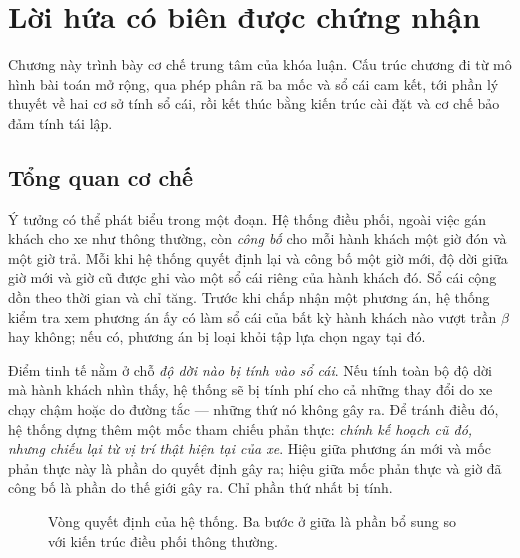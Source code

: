 \chapter{Lời hứa có biên được chứng nhận}

Chương này trình bày cơ chế trung tâm của khóa luận. Cấu trúc chương đi từ mô hình bài toán mở
rộng, qua phép phân rã ba mốc và sổ cái cam kết, tới phần lý thuyết về hai cơ sở tính sổ cái,
rồi kết thúc bằng kiến trúc cài đặt và cơ chế bảo đảm tính tái lập.

\section{Tổng quan cơ chế}

Ý tưởng có thể phát biểu trong một đoạn. Hệ thống điều phối, ngoài việc gán khách cho xe như
thông thường, còn \emph{công bố} cho mỗi hành khách một giờ đón và một giờ trả. Mỗi khi hệ
thống quyết định lại và công bố một giờ mới, độ dời giữa giờ mới và giờ cũ được ghi vào một sổ
cái riêng của hành khách đó. Sổ cái cộng dồn theo thời gian và chỉ tăng. Trước khi chấp nhận
một phương án, hệ thống kiểm tra xem phương án ấy có làm sổ cái của bất kỳ hành khách nào vượt
trần $\beta$ hay không; nếu có, phương án bị loại khỏi tập lựa chọn ngay tại đó.

Điểm tinh tế nằm ở chỗ \emph{độ dời nào bị tính vào sổ cái}. Nếu tính toàn bộ độ dời mà hành
khách nhìn thấy, hệ thống sẽ bị tính phí cho cả những thay đổi do xe chạy chậm hoặc do đường
tắc --- những thứ nó không gây ra. Để tránh điều đó, hệ thống dựng thêm một mốc tham chiếu phản
thực: \emph{chính kế hoạch cũ đó, nhưng chiếu lại từ vị trí thật hiện tại của xe}. Hiệu giữa
phương án mới và mốc phản thực này là phần do quyết định gây ra; hiệu giữa mốc phản thực và giờ
đã công bố là phần do thế giới gây ra. Chỉ phần thứ nhất bị tính.

\begin{figure}[htbp]
\centering
{}
\caption{Vòng quyết định của hệ thống. Ba bước ở giữa là phần bổ sung so với kiến trúc điều
phối thông thường.}
\label{hinh:vongquyetdinh}
\end{figure}


